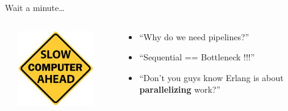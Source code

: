 \documentclass[aspectratio=169]{beamer}
\begin{document}
\begin{frame}{Wait a minute\dots}
    \begin{columns}
        \begin{column}[c]{0.05\textwidth}
        \end{column}
        \begin{column}[c]{0.3\textwidth}
            \includegraphics[width=0.8\textwidth]{images/slow.png}
        \end{column}
        \begin{column}[c]{0.65\textwidth}
            \begin{itemize}
                \item ``Why do we need pipelines?''
                \item ``Sequential == Bottleneck !!!''
                \item ``Don't you guys know Erlang is about \textbf{parallelizing} work?''
            \end{itemize}
        \end{column}
    \end{columns}
\end{frame}
\end{document}
